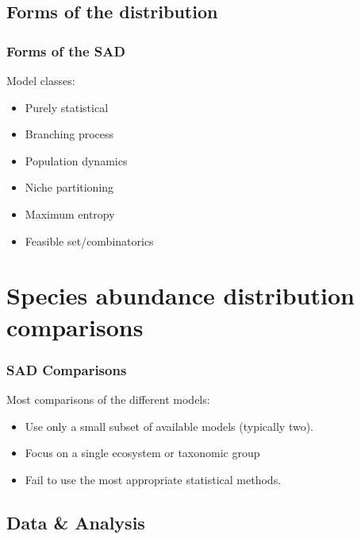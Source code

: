 \documentclass[14pt]{beamer}
\begin{document}
\subsection{Forms of the distribution}
\begin{frame}
\frametitle{Forms of the SAD}
\begin{large}
Model classes:
\end{large}
\begin{itemize}
\item Purely statistical
\item Branching process
\item Population dynamics
\item Niche partitioning
\item Maximum entropy
\item Feasible set/combinatorics
\end{itemize}
\end{frame}
 

\section{Species abundance distribution comparisons}
\begin{frame}
\frametitle{SAD Comparisons}
\begin{large}
Most comparisons of the different models:
\end{large}
\begin{itemize}
\item Use only a small subset of available models (typically two).
\item Focus on a single ecosystem or taxonomic group
\item Fail to use the most appropriate statistical methods. 
\end{itemize}
\end{frame}

\subsection{Data & Analysis}
\end{document}
